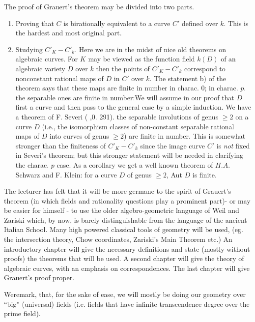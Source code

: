 The proof of Grauert's theorem may be divided into two parts. 
\begin{enumerate}[1)]
\item Proving that $C$ is birationally equivalent to a curve $C'$
  defined over $k$. This is the hardest and most original part. 
\item Studying $C'_K - C'_k$. Here we are in the midst of nice old
  theorems on algebraic curves. For $K$ may be viewed as the function
  field $k(D)$ of an algebraic variety $D$ over $k$ then the points of
  $C'_K - C'_k$ correspond to nonconstant rational maps of $D$ in $C'$
  over $k$. The statement b) of
  the theorem says that these maps are finite in number in charac. 0; in
  charac. $p$. the separable ones are finite in number:\pageoriginale We will assume
  in our proof that $D$ 
  first a curve and then pass to the general case by a simple
  induction. We have a theorem of F. Severi (\cite{8} ,0. 291). the
  separable involutions of genus $\geq 2$ on a curve $D$ (i.e., the
  isomorphism classes of non-constant separable rational maps of $D$
  into curves of genus $\geq 2$) are finite in number. This is
  somewhat stronger than the finiteness of $C'_K - C'_k$ since the
  image curve $C'$ is \textit{not} fixed in Severi's theorem; but this
  stronger statement will be needed in clarifying the charac. $p$
  case. As a corollary we get a well known theorem of $H.A$. Schwarz
  and F. Klein: for a curve $D$ of genus $\geq 2$, Aut $D$ is
  finite. 
\end{enumerate}

The lecturer has felt that it will be more germane to the spirit of
Grauert's theorem (in which fields and rationality questions play a\break
prominent part)- or may be easier for himself - to use the older
algebro-geometric language of Weil and Zariski which, by now, is
barely distinguishable from the language of the ancient Italian
School. Many high powered classical tools of geometry will be used,
(eg. the intersection theory, Chow coordinates, Zariski's Main Theorem
etc.) An introductory chapter will give the necessary definitions and
state (mostly without proofs) the theorems that will be used. A second
chapter will give the theory of algebraic curves, with an emphasis on
correspondences. The last chapter will give Grauert's proof proper. 

We\pageoriginale remark, that, for the sake of ease, we will mostly be doing our
geometry over ``big'' (universal) fields (i.e. fields that have infinite
transcendence degree over the prime field). 
